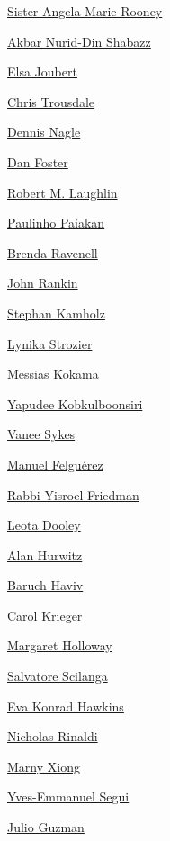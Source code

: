 \protect\hyperlink{sister-angela-marie-rooney}{Sister Angela Marie
Rooney}

\protect\hyperlink{akbar-nuriddin-shabazz}{Akbar Nurid-Din Shabazz}

\protect\hyperlink{elsa-joubert}{Elsa Joubert}

\protect\hyperlink{chris-trousdale}{Chris Trousdale}

\protect\hyperlink{dennis-nagle}{Dennis Nagle}

\protect\hyperlink{dan-foster}{Dan Foster}

\protect\hyperlink{robert-m-laughlin}{Robert M. Laughlin}

\protect\hyperlink{paulinho-paiakan}{Paulinho Paiakan}

\protect\hyperlink{brenda-ravenell}{Brenda Ravenell}

\protect\hyperlink{john-rankin}{John Rankin}

\protect\hyperlink{stephan-kamholz}{Stephan Kamholz}

\protect\hyperlink{-lynika-strozier-}{Lynika Strozier}

\protect\hyperlink{messias-kokama}{Messias Kokama}

\protect\hyperlink{yapudee-kobkulboonsiri}{Yapudee Kobkulboonsiri}

\protect\hyperlink{vanee-sykes}{Vanee Sykes}

\protect\hyperlink{manuel-felguuxe9rez}{Manuel Felguérez}

\protect\hyperlink{rabbi-yisroel-friedman}{Rabbi Yisroel Friedman}

\protect\hyperlink{leota-dooley}{Leota Dooley}

\protect\hyperlink{alan-hurwitz}{Alan Hurwitz}

\protect\hyperlink{baruch-haviv}{Baruch Haviv}

\protect\hyperlink{carol-krieger}{Carol Krieger}

\protect\hyperlink{margaret-holloway}{Margaret Holloway}

\protect\hyperlink{salvatore-scilanga}{Salvatore Scilanga}

\protect\hyperlink{eva-konrad-hawkins}{Eva Konrad Hawkins}

\protect\hyperlink{nicholas-rinaldi}{Nicholas Rinaldi}

\protect\hyperlink{marny-xiong}{Marny Xiong}

\protect\hyperlink{-yvesemmanuel-segui}{Yves-Emmanuel Segui}

\protect\hyperlink{julio-guzman}{Julio Guzman}

